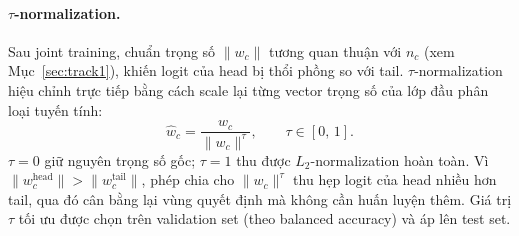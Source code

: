 \medskip


\paragraph{$\tau$-normalization.}
Sau joint training, chuẩn trọng số $\lVert w_c \rVert$ tương quan
thuận với $n_c$ (xem Mục~\ref{sec:track1}),
khiến logit của head bị thổi phồng so với tail.
$\tau$-normalization hiệu chỉnh trực tiếp bằng cách scale lại
từng vector trọng số của lớp đầu phân loại tuyến tính:
\begin{equation}
    \hat{w}_c = \frac{w_c}{\lVert w_c \rVert^{\tau}},
    \qquad \tau \in [0,\,1].
    \label{eq:tau-norm-t2}
\end{equation}
$\tau = 0$ giữ nguyên trọng số gốc;
$\tau = 1$ thu được $L_2$-normalization hoàn toàn.
Vì $\lVert w_c^{\text{head}} \rVert > \lVert w_c^{\text{tail}} \rVert$,
phép chia cho $\lVert w_c \rVert^\tau$ thu hẹp logit của head
nhiều hơn tail, qua đó cân bằng lại vùng quyết định
mà không cần huấn luyện thêm.
Giá trị $\tau$ tối ưu được chọn trên validation set
(theo balanced accuracy) và áp lên test set.
 


